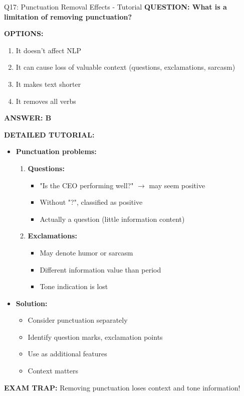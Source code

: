 \documentclass[8pt]{beamer}
\begin{document}
	\begin{frame}{Q17: Punctuation Removal Effects - Tutorial}
		\fontsize{6.5}{7.5}\selectfont
		\textbf{QUESTION: What is a limitation of removing punctuation?}
		
		\vspace{0.1cm}
		\textbf{OPTIONS:}
		\begin{enumerate}
			\item It doesn't affect NLP
			\item It can cause loss of valuable context (questions, exclamations, sarcasm)
			\item It makes text shorter
			\item It removes all verbs
		\end{enumerate}
		
		\vspace{0.1cm}
		\textcolor{myblue}{\textbf{ANSWER: B}}
		
		\vspace{0.1cm}
		\textbf{DETAILED TUTORIAL:}
		\begin{itemize}
			\item \textbf{Punctuation problems:}
			\begin{enumerate}
				\item \textbf{Questions:}
				\begin{itemize}
					\item "Is the CEO performing well?" $\rightarrow$ may seem positive
					\item Without "?", classified as positive
					\item Actually a question (little information content)
				\end{itemize}
				\item \textbf{Exclamations:}
				\begin{itemize}
					\item May denote humor or sarcasm
					\item Different information value than period
					\item Tone indication is lost
				\end{itemize}
			\end{enumerate}
			\item \textbf{Solution:}
			\begin{itemize}
				\item Consider punctuation separately
				\item Identify question marks, exclamation points
				\item Use as additional features
				\item Context matters
			\end{itemize}
		\end{itemize}
		
		\textcolor{myred}{\textbf{EXAM TRAP:}} Removing punctuation loses \textcolor{myblue}{context and tone} information!
	\end{frame}
	
\end{document}
